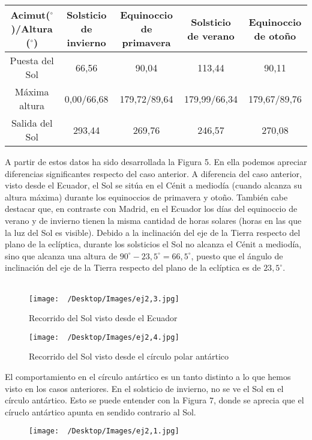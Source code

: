 \documentclass{article}
\begin{document}
\begin{sol}
\begin{center}
\begin{tabular}{|c|c|c|c|c|}
	\hline 
	Acimut($\displaystyle ^{\circ} $)/Altura ($\displaystyle ^{\circ} $) & Solsticio de invierno & Equinoccio de primavera & Solsticio de verano & Equinoccio de otoño \\
	\hline 
	Puesta del Sol & 66,56 & 90,04 & 113,44 & 90,11 \\
	\hline
	Máxima altura & 0,00/66,68 & 179,72/89,64 & 179,99/66,34 & 179,67/89,76\\
	\hline
	Salida del Sol & 293,44 & 269,76 & 246,57& 270,08 \\
	\hline
\end{tabular}
\end{center}
A partir de estos datos ha sido desarrollada la Figura 5. En ella podemos apreciar diferencias significantes respecto del caso anterior. A diferencia del caso anterior, visto desde el Ecuador, el Sol se sitúa en el Cénit a mediodía (cuando alcanza su altura máxima) durante los equinoccios de primavera y otoño. También cabe destacar que, en contraste con Madrid, en el Ecuador los días del equinoccio de verano y de invierno tienen la misma cantidad de horas solares (horas en las que la luz del Sol es visible). Debido a la inclinación del eje de la Tierra respecto del plano de la eclíptica, durante los solsticios el Sol no alcanza el Cénit a mediodía, sino que alcanza una altura de $\displaystyle 90^{\circ} - 23,5^{\circ} = 66,5^{\circ} $, puesto que el ángulo de inclinación del eje de la Tierra respecto del plano de la eclíptica es de $\displaystyle 23,5^{\circ} $. \\ \\
\begin{figure}
\centering
\texttt{[image: ~/Desktop/Images/ej2,3.jpg]}
\caption{Recorrido del Sol visto desde el Ecuador}
\label{}
\end{figure}
\begin{figure}
\centering
\texttt{[image: ~/Desktop/Images/ej2,4.jpg]}
\caption{Recorrido del Sol visto desde el círculo polar antártico}
\label{}
\end{figure}
El comportamiento en el círculo antártico es un tanto distinto a lo que hemos visto en los casos anteriores. En el solsticio de invierno, no se ve el Sol en el círculo antártico. Esto se puede entender con la Figura 7, donde se aprecia que el círuclo antártico apunta en sendido contrario al Sol.
\begin{figure}
\centering
\texttt{[image: ~/Desktop/Images/ej2,1.jpg]}

\end{figure}
\end{sol}
\end{document}
